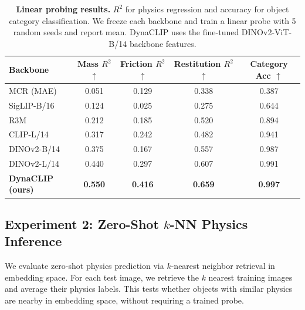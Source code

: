 \documentclass{article}
\newcommand{\methodname}{DynaCLIP}
\begin{document}
\begin{table}[h]
\centering
\caption{\textbf{Linear probing results.} $R^2$ for physics regression and accuracy for object category classification. We freeze each backbone and train a linear probe with 5 random seeds and report mean. \methodname{} uses the fine-tuned DINOv2-ViT-B/14 backbone features.}
\label{tab:linear_probing}
\begin{tabular}{lcccc}
\toprule
\textbf{Backbone} & \textbf{Mass $R^2$ $\uparrow$} & \textbf{Friction $R^2$ $\uparrow$} & \textbf{Restitution $R^2$ $\uparrow$} & \textbf{Category Acc $\uparrow$} \\
\midrule
MCR (MAE)~\cite{radosavovic2023vc1}  & 0.051 & 0.129 & 0.338 & 0.387 \\
SigLIP-B/16         & 0.124 & 0.025 & 0.275 & 0.644 \\
R3M~\cite{nair2022r3m}               & 0.212 & 0.185 & 0.520 & 0.894 \\
CLIP-L/14           & 0.317 & 0.242 & 0.482 & 0.941 \\
DINOv2-B/14         & 0.375 & 0.167 & 0.557 & 0.987 \\
DINOv2-L/14         & 0.440 & 0.297 & 0.607 & 0.991 \\
\midrule
\textbf{\methodname{} (ours)} & \textbf{0.550} & \textbf{0.416} & \textbf{0.659} & \textbf{0.997} \\
\bottomrule
\end{tabular}
\end{table}


\subsection{Experiment 2: Zero-Shot $k$-NN Physics Inference}
\label{sec:exp2}

We evaluate zero-shot physics prediction via $k$-nearest neighbor retrieval in embedding space. For each test image, we retrieve the $k$ nearest training images and average their physics labels. This tests whether objects with similar physics are nearby in embedding space, without requiring a trained probe.
\end{document}
